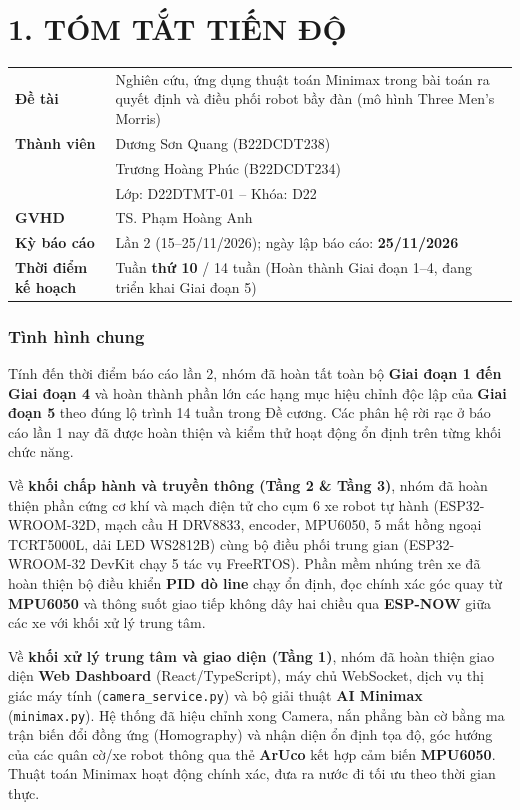 \documentclass[14pt,a4paper]{extreport}
\begin{document}
\chapter*{1. TÓM TẮT TIẾN ĐỘ}
 
\begin{table}[H]
\renewcommand{\arraystretch}{1.3}
\begin{tabular}{@{}L{4.5cm} L{10cm}@{}}
\textbf{Đề tài} & Nghiên cứu, ứng dụng thuật toán Minimax trong bài toán ra quyết định và điều phối robot bầy đàn (mô hình Three Men's Morris) \\
\textbf{Thành viên} & Dương Sơn Quang (B22DCDT238)\\ & Trương Hoàng Phúc (B22DCDT234)\\ & Lớp: D22DTMT-01 -- Khóa: D22 \\
\textbf{GVHD} & TS. Phạm Hoàng Anh \\
\textbf{Kỳ báo cáo} & Lần 2 (15--25/11/2026); ngày lập báo cáo: \textbf{25/11/2026} \\
\textbf{Thời điểm kế hoạch} & Tuần \textbf{thứ 10} / 14 tuần (Hoàn thành Giai đoạn 1--4, đang triển khai Giai đoạn 5) \\
\end{tabular}
\end{table}
 
\subsection*{Tình hình chung}
Tính đến thời điểm báo cáo lần 2, nhóm đã hoàn tất toàn bộ \textbf{Giai đoạn 1 đến Giai đoạn 4} và hoàn thành phần lớn các hạng mục hiệu chỉnh độc lập của \textbf{Giai đoạn 5} theo đúng lộ trình 14 tuần trong Đề cương. Các phân hệ rời rạc ở báo cáo lần 1 nay đã được hoàn thiện và kiểm thử hoạt động ổn định trên từng khối chức năng.

Về \textbf{khối chấp hành và truyền thông (Tầng 2 \& Tầng 3)}, nhóm đã hoàn thiện phần cứng cơ khí và mạch điện tử cho cụm 6 xe robot tự hành (ESP32-WROOM-32D, mạch cầu H DRV8833, encoder, MPU6050, 5 mắt hồng ngoại TCRT5000L, dải LED WS2812B) cùng bộ điều phối trung gian (ESP32-WROOM-32 DevKit chạy 5 tác vụ FreeRTOS). Phần mềm nhúng trên xe đã hoàn thiện bộ điều khiển \textbf{PID dò line} chạy ổn định, đọc chính xác góc quay từ \textbf{MPU6050} và thông suốt giao tiếp không dây hai chiều qua \textbf{ESP-NOW} giữa các xe với khối xử lý trung tâm.

Về \textbf{khối xử lý trung tâm và giao diện (Tầng 1)}, nhóm đã hoàn thiện giao diện \textbf{Web Dashboard} (React/TypeScript), máy chủ WebSocket, dịch vụ thị giác máy tính (\texttt{camera\_service.py}) và bộ giải thuật \textbf{AI Minimax} (\texttt{minimax.py}). Hệ thống đã hiệu chỉnh xong Camera, nắn phẳng bàn cờ bằng ma trận biến đổi đồng ứng (Homography) và nhận diện ổn định tọa độ, góc hướng của các quân cờ/xe robot thông qua thẻ \textbf{ArUco} kết hợp cảm biến \textbf{MPU6050}. Thuật toán Minimax hoạt động chính xác, đưa ra nước đi tối ưu theo thời gian thực.
\end{document}
